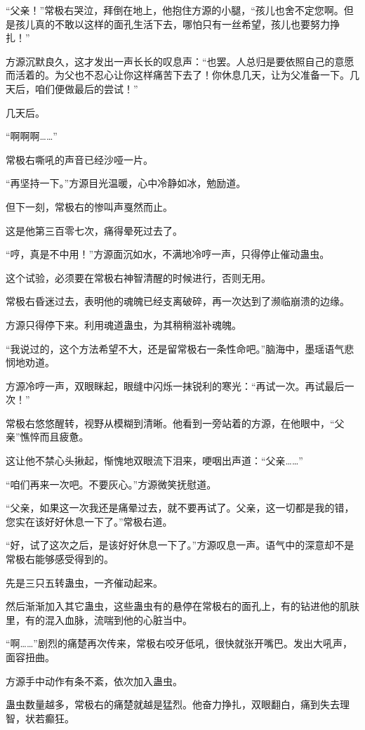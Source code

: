 \begin{this_body}
“父亲！”常极右哭泣，拜倒在地上，他抱住方源的小腿，“孩儿也舍不定您啊。但是孩儿真的不敢以这样的面孔生活下去，哪怕只有一丝希望，孩儿也要努力挣扎！”

方源沉默良久，这才发出一声长长的叹息声：“也罢。人总归是要依照自己的意愿而活着的。为父也不忍心让你这样痛苦下去了！你休息几天，让为父准备一下。几天后，咱们便做最后的尝试！”

几天后。

“啊啊啊……”

常极右嘶吼的声音已经沙哑一片。

“再坚持一下。”方源目光温暖，心中冷静如冰，勉励道。

但下一刻，常极右的惨叫声戛然而止。

这是他第三百零七次，痛得晕死过去了。

“哼，真是不中用！”方源面沉如水，不满地冷哼一声，只得停止催动蛊虫。

这个试验，必须要在常极右神智清醒的时候进行，否则无用。

常极右昏迷过去，表明他的魂魄已经支离破碎，再一次达到了濒临崩溃的边缘。

方源只得停下来。利用魂道蛊虫，为其稍稍滋补魂魄。

“我说过的，这个方法希望不大，还是留常极右一条性命吧。”脑海中，墨瑶语气悲悯地劝道。

方源冷哼一声，双眼眯起，眼缝中闪烁一抹锐利的寒光：“再试一次。再试最后一次！”

常极右悠悠醒转，视野从模糊到清晰。他看到一旁站着的方源，在他眼中，“父亲”憔悴而且疲惫。

这让他不禁心头揪起，惭愧地双眼流下泪来，哽咽出声道：“父亲……”

“咱们再来一次吧。不要灰心。”方源微笑抚慰道。

“父亲，如果这一次我还是痛晕过去，就不要再试了。父亲，这一切都是我的错，您实在该好好休息一下了。”常极右道。

“好，试了这次之后，是该好好休息一下了。”方源叹息一声。语气中的深意却不是常极右能够感受得到的。

先是三只五转蛊虫，一齐催动起来。

然后渐渐加入其它蛊虫，这些蛊虫有的悬停在常极右的面孔上，有的钻进他的肌肤里，有的混入血脉，流喘到他的心脏当中。

“啊……”剧烈的痛楚再次传来，常极右咬牙低吼，很快就张开嘴巴。发出大吼声，面容扭曲。

方源手中动作有条不紊，依次加入蛊虫。

蛊虫数量越多，常极右的痛楚就越是猛烈。他奋力挣扎，双眼翻白，痛到失去理智，状若癫狂。


\end{this_body}
